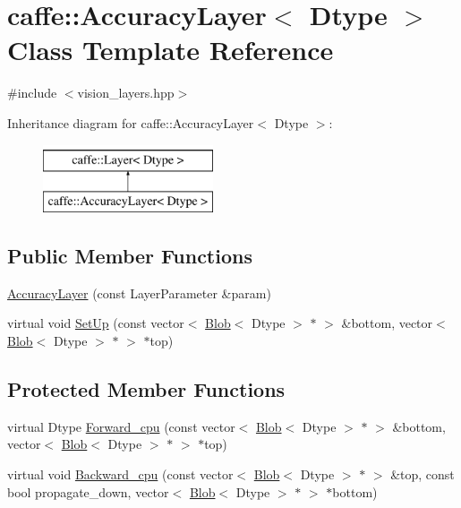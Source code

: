 \hypertarget{classcaffe_1_1_accuracy_layer}{\section{caffe\+:\+:Accuracy\+Layer$<$ Dtype $>$ Class Template Reference}
\label{classcaffe_1_1_accuracy_layer}
}


{\ttfamily \#include $<$vision\+\_\+layers.\+hpp$>$}

Inheritance diagram for caffe\+:\+:Accuracy\+Layer$<$ Dtype $>$\+:\begin{figure}[H]
\begin{center}
\leavevmode
\includegraphics[height=2.000000cm]{classcaffe_1_1_accuracy_layer}
\end{center}
\end{figure}
\subsection*{Public Member Functions}
\begin{DoxyCompactItemize}
\item 
\hyperlink{classcaffe_1_1_accuracy_layer_a362ab61d1961c1b408f84a956f6e598d}{Accuracy\+Layer} (const Layer\+Parameter \&param)
\item 
virtual void \hyperlink{classcaffe_1_1_accuracy_layer_a5c18f1e710a9d59c0180ad2cd6dc4537}{Set\+Up} (const vector$<$ \hyperlink{classcaffe_1_1_blob}{Blob}$<$ Dtype $>$ $\ast$ $>$ \&bottom, vector$<$ \hyperlink{classcaffe_1_1_blob}{Blob}$<$ Dtype $>$ $\ast$ $>$ $\ast$top)
\end{DoxyCompactItemize}
\subsection*{Protected Member Functions}
\begin{DoxyCompactItemize}
\item 
virtual Dtype \hyperlink{classcaffe_1_1_accuracy_layer_a6b009239ed19e1568fda06654af26e39}{Forward\+\_\+cpu} (const vector$<$ \hyperlink{classcaffe_1_1_blob}{Blob}$<$ Dtype $>$ $\ast$ $>$ \&bottom, vector$<$ \hyperlink{classcaffe_1_1_blob}{Blob}$<$ Dtype $>$ $\ast$ $>$ $\ast$top)
\item 
virtual void \hyperlink{classcaffe_1_1_accuracy_layer_a18aff36af82433e25eca1e0de3276d7f}{Backward\+\_\+cpu} (const vector$<$ \hyperlink{classcaffe_1_1_blob}{Blob}$<$ Dtype $>$ $\ast$ $>$ \&top, const bool propagate\+\_\+down, vector$<$ \hyperlink{classcaffe_1_1_blob}{Blob}$<$ Dtype $>$ $\ast$ $>$ $\ast$bottom)
\end{DoxyCompactItemize}
